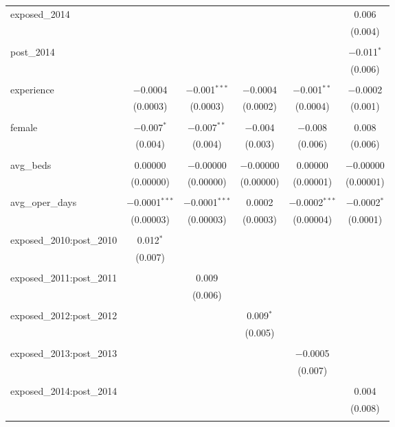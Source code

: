 \begin{table}[!htbp]
\begin{tabular}{@{\extracolsep{5pt}}lccccc}
 exposed\_2014 &  &  &  &  & 0.006 \\ 
  &  &  &  &  & (0.004) \\ 
  & & & & & \\ 
 post\_2014 &  &  &  &  & $-$0.011$^{*}$ \\ 
  &  &  &  &  & (0.006) \\ 
  & & & & & \\ 
 experience & $-$0.0004 & $-$0.001$^{***}$ & $-$0.0004 & $-$0.001$^{**}$ & $-$0.0002 \\ 
  & (0.0003) & (0.0003) & (0.0002) & (0.0004) & (0.001) \\ 
  & & & & & \\ 
 female & $-$0.007$^{*}$ & $-$0.007$^{**}$ & $-$0.004 & $-$0.008 & 0.008 \\ 
  & (0.004) & (0.004) & (0.003) & (0.006) & (0.006) \\ 
  & & & & & \\ 
 avg\_beds & 0.00000 & $-$0.00000 & $-$0.00000 & 0.00000 & $-$0.00000 \\ 
  & (0.00000) & (0.00000) & (0.00000) & (0.00001) & (0.00001) \\ 
  & & & & & \\ 
 avg\_oper\_days & $-$0.0001$^{***}$ & $-$0.0001$^{***}$ & 0.0002 & $-$0.0002$^{***}$ & $-$0.0002$^{*}$ \\ 
  & (0.00003) & (0.00003) & (0.0003) & (0.00004) & (0.0001) \\ 
  & & & & & \\ 
 exposed\_2010:post\_2010 & 0.012$^{*}$ &  &  &  &  \\ 
  & (0.007) &  &  &  &  \\ 
  & & & & & \\ 
 exposed\_2011:post\_2011 &  & 0.009 &  &  &  \\ 
  &  & (0.006) &  &  &  \\ 
  & & & & & \\ 
 exposed\_2012:post\_2012 &  &  & 0.009$^{*}$ &  &  \\ 
  &  &  & (0.005) &  &  \\ 
  & & & & & \\ 
 exposed\_2013:post\_2013 &  &  &  & $-$0.0005 &  \\ 
  &  &  &  & (0.007) &  \\ 
  & & & & & \\ 
 exposed\_2014:post\_2014 &  &  &  &  & 0.004 \\ 
  &  &  &  &  & (0.008) \\ 
  & & & & & \\ 

\end{tabular}
\end{table}
